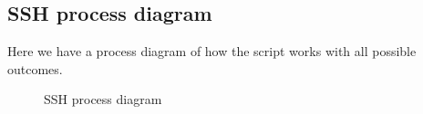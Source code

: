 \subsection{SSH process diagram}
Here we have a process diagram of how the script works with all possible outcomes.

\begin{figure}[H]
        \usetikzlibrary{shapes,arrows,calc}
        \centering
        
        \caption{SSH process diagram}
\end{figure}
\newpage
